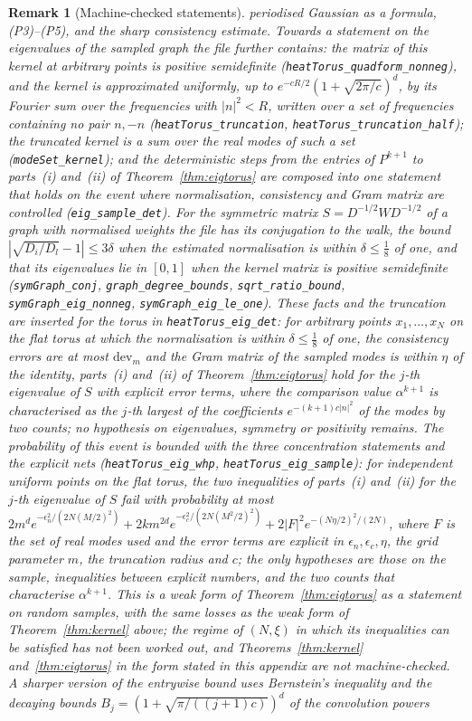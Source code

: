 \documentclass[11pt,a4paper]{article}
\theoremstyle{stmt}
\theoremstyle{defn}
\theoremstyle{rmk}
\newtheorem{remark}[theorem]{Remark}
\numberwithin{equation}{section}
\begin{document}
{\begin{remark}[Machine-checked statements]
periodised Gaussian as a formula, (P3)--(P5), and the sharp consistency estimate. Towards a statement on the eigenvalues of the sampled graph the file further contains: the matrix of this kernel at arbitrary points is positive semidefinite (\texttt{heatTorus\_quadform\_nonneg}), and the kernel is approximated uniformly, up to $e^{-cR/2}(1+\sqrt{2\pi/c})^d$, by its Fourier sum over the frequencies with $|n|^2<R$, written over a set of frequencies containing no pair $n,-n$ (\texttt{heatTorus\_truncation}, \texttt{heatTorus\_truncation\_half}); the truncated kernel is a sum over the real modes of such a set (\texttt{modeSet\_kernel}); and the deterministic steps from the entries of $P^{k+1}$ to parts~(i) and~(ii) of Theorem~\ref{thm:eigtorus} are composed into one statement that holds on the event where normalisation, consistency and Gram matrix are controlled (\texttt{eig\_sample\_det}). For the symmetric matrix $S=D^{-1/2}WD^{-1/2}$ of a graph with normalised weights the file has its conjugation to the walk, the bound $|\sqrt{D_i/D_l}-1|\le3\delta$ when the estimated normalisation is within $\delta\le\frac18$ of one, and that its eigenvalues lie in $[0,1]$ when the kernel matrix is positive semidefinite (\texttt{symGraph\_conj}, \texttt{graph\_degree\_bounds}, \texttt{sqrt\_ratio\_bound}, \texttt{symGraph\_eig\_nonneg}, \texttt{symGraph\_eig\_le\_one}). These facts and the truncation are inserted for the torus in \texttt{heatTorus\_eig\_det}: for arbitrary points $x_1,\dots,x_N$ on the flat torus at which the normalisation is within $\delta\le\frac18$ of one, the consistency errors are at most $\mathrm{dev}_m$ and the Gram matrix of the sampled modes is within $\eta$ of the identity, parts~(i) and~(ii) of Theorem~\ref{thm:eigtorus} hold for the $j$-th eigenvalue of $S$ with explicit error terms, where the comparison value $\alpha^{k+1}$ is characterised as the $j$-th largest of the coefficients $e^{-(k+1)c|n|^2}$ of the modes by two counts; no hypothesis on eigenvalues, symmetry or positivity remains. The probability of this event is bounded with the three concentration statements and the explicit nets (\texttt{heatTorus\_eig\_whp}, \texttt{heatTorus\_eig\_sample}): for independent uniform points on the flat torus, the two inequalities of parts~(i) and~(ii) for the $j$-th eigenvalue of $S$ fail with probability at most $2m^de^{-\epsilon_n^2/(2N(M/2)^2)}+2km^{2d}e^{-\epsilon_c^2/(2N(M^2/2)^2)}+2|F|^2e^{-(N\eta/2)^2/(2N)}$, where $F$ is the set of real modes used and the error terms are explicit in $\epsilon_n,\epsilon_c,\eta$, the grid parameter $m$, the truncation radius and $c$; the only hypotheses are those on the sample, inequalities between explicit numbers, and the two counts that characterise $\alpha^{k+1}$. This is a weak form of Theorem~\ref{thm:eigtorus} as a statement on random samples, with the same losses as the weak form of Theorem~\ref{thm:kernel} above; the regime of $(N,\xi)$ in which its inequalities can be satisfied has not been worked out, and Theorems~\ref{thm:kernel} and~\ref{thm:eigtorus} in the form stated in this appendix are not machine-checked. A sharper version of the entrywise bound uses Bernstein's inequality and the decaying bounds $B_j=(1+\sqrt{\pi/((j+1)c)})^d$ of the convolution powers 
\end{remark}}
\end{document}
